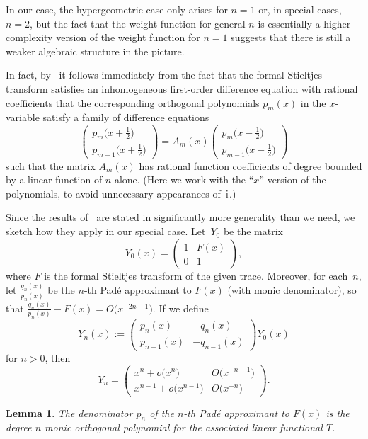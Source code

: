 \documentclass[10pt,a4paper]{amsart}
\newtheorem{Lemma}[Theorem]{Lemma}
\theoremstyle{definition}
\numberwithin{equation}{section}
\begin{document}
In our case, the hypergeometric case only arises for $n=1$ or, in special
cases, $n=2$, but the fact that the weight function for general $n$ is
essentially a higher complexity version of the weight function for $n=1$
suggests that there is still a weaker algebraic structure in the
picture.

In fact, by~\cite{Magnus} it follows immediately from the fact that the
formal Stieltjes transform satisfies an inhomogeneous first-order
difference equation with rational coefficients that the corresponding orthogonal
polynomials $p_m(x)$ in the $x$-variable satisfy a family of difference equations
\[
\begin{pmatrix}
p_m\big(x+\frac{1}{2}\big)\\[1ex]
p_{m-1}\big(x+\frac{1}{2}\big)
\end{pmatrix}
= A_m(x)
\begin{pmatrix}
p_m\big(x-\tfrac{1}{2}\big)\\[1ex]
p_{m-1}\big(x-\tfrac{1}{2}\big)
\end{pmatrix}
\]
such that the matrix $A_m(x)$ has rational function coefficients of degree
bounded by a linear function of $n$ alone. (Here we work with the ``$x$''
version of the polynomials, to avoid unnecessary appearances of~${\rm i}$.)

Since the results of~\cite{Magnus} are stated in significantly more
generality than we need, we sketch how they apply in our special case. Let~$Y_0$ be the matrix
\[
Y_0(x) = \begin{pmatrix} 1 & F(x) \\ 0 & 1\end{pmatrix} ,
\]
where $F$ is the formal Stieltjes transform of the given trace. Moreover,
for each~$n$, let $\frac{q_n(x)}{p_n(x)}$ be the $n$-th Pad\'e approximant to $F(x)$
(with monic denominator), so that $\frac{q_n(x)}{p_n(x)}-F(x)=O\big(x^{-2n-1}\big)$. If we
define
\[
Y_n(x):= \begin{pmatrix} p_n(x) & -q_n(x)\\ p_{n-1}(x) & -q_{n-1}(x)\end{pmatrix}
Y_0(x)
\]
for $n>0$, then
\[
Y_n = \begin{pmatrix} x^n+o\big(x^n\big) & O\big(x^{-n-1}\big)\\
 x^{n-1}+o\big(x^{n-1}\big) & O\big(x^{-n}\big)\end{pmatrix} .
\]

\begin{Lemma}
 The denominator $p_n$ of the $n$-th Pad\'e approximant to $F(x)$ is the
 degree $n$ monic orthogonal polynomial for the associated linear
 functional $T$.
\end{Lemma}
\end{document}
